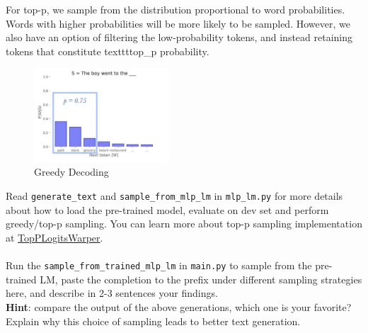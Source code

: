 For top-p, we sample from the distribution proportional to word probabilities. Words with higher probabilities will be more likely to be sampled.
However, we also have an option of filtering the low-probability tokens, and instead retaining tokens that constitute texttt{top\_p} probability.
\begin{figure}[h]
    \centering
    \includegraphics[width=0.45\textwidth]{figures/p_sampling.jpeg}
    \caption{Greedy Decoding}
\end{figure}

\noindent Read \texttt{generate\_text} and \texttt{sample\_from\_mlp\_lm} in \texttt{mlp\_lm.py} for more details about how to load the pre-trained model, evaluate on dev set and perform greedy/top-p sampling. You can learn more about top-p sampling implementation at \href{https://huggingface.co/docs/transformers/v4.37.2/en/internal/generation_utils#transformers.TopPLogitsWarper}{TopPLogitsWarper}.\\\\
\noindent \todo{} Run the \texttt{sample\_from\_trained\_mlp\_lm} in \texttt{main.py} to sample from the pre-trained LM, paste the completion to the prefix under different sampling strategies here, and describe in 2-3 sentences your findings.\\
\noindent \textbf{Hint}: compare the output of the above generations, which one is your favorite? Explain why this choice of sampling leads to better text generation.

\noindent {}








